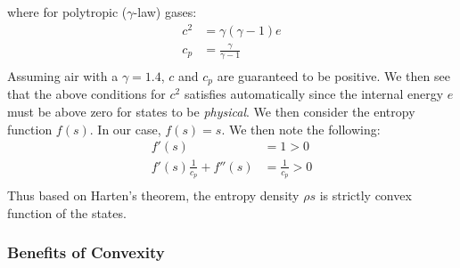 \documentclass[a4paper]{article}
\numberwithin{equation}{section}
\begin{document}
where for polytropic ($\gamma$-law) gases:
\begin{equation}
    \begin{split}
        c^2 &= \gamma(\gamma -1) e\\
        c_p &= \frac{\gamma}{\gamma - 1}\\
    \end{split}
\end{equation}
Assuming air with a $\gamma = 1.4$, $c$ and $c_p$ are guaranteed to be positive. We then see that the above conditions for $c^2$ satisfies automatically since the internal energy $e$ must be above zero for states to be \textit{physical}. We then consider the entropy function $f(s)$. In our case, $f(s) = s$. We then note the following:
\begin{equation}
    \begin{split}
        f'(s) &= 1 > 0\\
        f'(s)\frac{1}{c_p} + f''(s) &= \frac{1}{c_p} > 0\\
    \end{split}
\end{equation}
Thus based on Harten's theorem, the entropy density $\rho s$ is strictly convex function of the states. 

\subsubsection{Benefits of Convexity}

\end{document}
